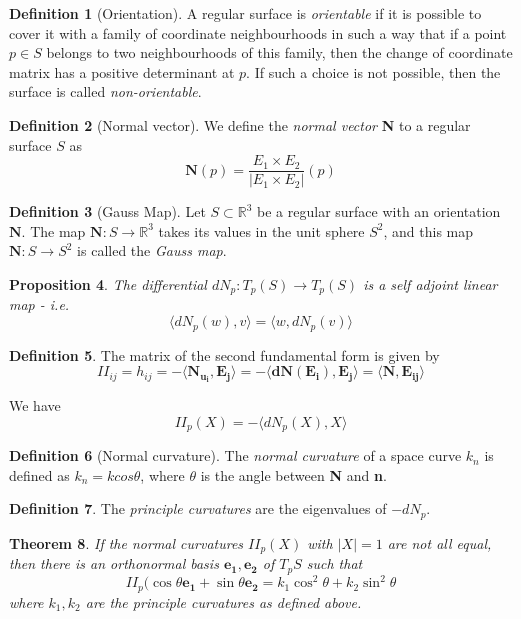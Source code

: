 \documentclass[10pt, oneside, reqno]{amsart}
\newcommand{\R}{\mathbb{R}}
\theoremstyle{plain}%
\newtheorem{thm}{Theorem}[section]
\newtheorem{prop}[thm]{Proposition}
\theoremstyle{definition}
\newtheorem{defn}[thm]{Definition}
\theoremstyle{remark}
\begin{document}
\begin{defn}[Orientation]
	A regular surface is \emph{orientable} if it is possible to cover it with a family of coordinate neighbourhoods in such a way that if a point $p \in S$ belongs to two neighbourhoods of this family, then the change of coordinate matrix has a positive determinant at $p$.  If such a choice is not possible, then the surface is called \emph{non-orientable}.
\end{defn}

\begin{defn}[Normal vector]
	We define the \emph{normal vector} \textbf{N} to a regular surface $S$ as \[
		\mathbf{N}(p) = \frac{E_1 \times E_2}{|E_1 \times E_2|}(p)
	\]
\end{defn}

\begin{defn}[Gauss Map]
	Let $S \subset \R^3$ be a regular surface with an orientation $\mathbf{N}$.  The map $\mathbf{N}: S \rightarrow \R^3$ takes its values in the unit sphere $S^2$, and this map $\mathbf{N}: S \rightarrow S^2$ is called the \emph{Gauss map}.  
\end{defn}

\begin{prop}
	The differential $dN_p : T_p(S) \rightarrow T_p(S)$ is a self adjoint linear map - \emph{i.e.} \[
		\langle dN_p(w),v \rangle = \langle w,dN_p(v) \rangle
	\]
\end{prop}

\begin{defn}
	The matrix of the second fundamental form is given by \[ II_{ij} = h_{ij} = -\langle \mathbf{N_{u_i}},\mathbf{E_j} \rangle = -\langle  \mathbf{dN(E_i)},\mathbf{E_j} \rangle = \langle \mathbf{N}, \mathbf{E_{ij}} \rangle \]

We have \[
	II_p(X) = - \langle dN_p(X),X \rangle
\]
\end{defn}

\begin{defn}[Normal curvature]
	The \emph{normal curvature} of a space curve $k_n$ is defined as $k_n = k cos \theta$, where $\theta$ is the angle between \textbf{N} and \textbf{n}.
\end{defn}

\begin{defn}
	The \emph{principle curvatures} are the eigenvalues of $-dN_p$.     
\end{defn}

\begin{thm}
	If the normal curvatures $	II_p(X) $ with $|X| = 1$ are not all equal, then there is an orthonormal basis $\mathbf{e_1}, \mathbf{e_2}$ of $T_p S$ such that \[
			II_p(\cos \theta \mathbf{e_1} + \sin \theta \mathbf{e_2} = k_1 \cos^2 \theta + k_2 \sin^2 \theta
	\]
	where $k_1,k_2$ are the principle curvatures as defined above.
\end{thm}
\end{document}
